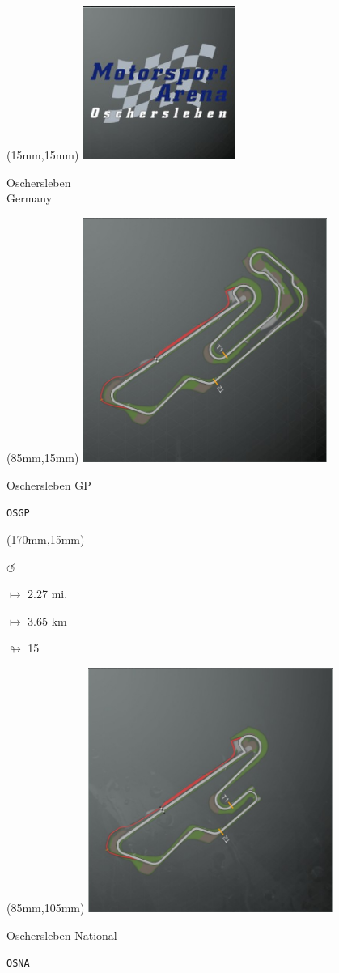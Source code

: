 \begin{textblock*}{60mm}(15mm,15mm)%
\includegraphics[width=50mm]{LG/2015-05-20_00090.png}
\par Oschersleben\\ Germany
\end{textblock*}
\begin{textblock*}{80mm}(85mm,15mm)%
\includegraphics[width=80mm]{TR/2015-05-20_00045.png}
\centerline{Oschersleben GP}
\par\hfill\tiny\tt OSGP\\
\end{textblock*}
\begin{textblock*}{30mm}(170mm,15mm)%
\par \Huge$\circlearrowleft$
\Large
\par$\mapsto$ 2.27 mi.
\par$\mapsto$ 3.65 km
\par$\looparrowright$ 15
\end{textblock*}
\begin{textblock*}{80mm}(85mm,105mm)%
\includegraphics[width=80mm]{TR/2015-05-20_00046.png}
\centerline{Oschersleben National}
\par\hfill\tiny\tt OSNA\\
\end{textblock*}
